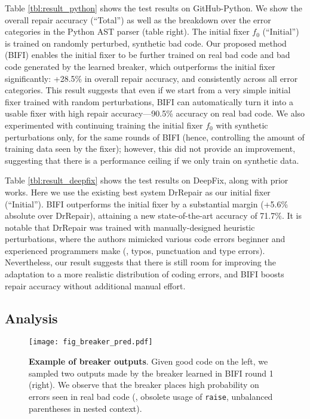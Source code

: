 Table \ref{tbl:result_python} shows the test results on GitHub-Python. We show the overall repair accuracy (``Total'') as well as the breakdown over the error categories in the Python AST parser (table right).
The initial fixer $f_0$ (``Initial'') 
is trained on randomly perturbed, synthetic bad code. 
Our proposed method (BIFI) enables the initial fixer to be further trained on real bad code and bad code generated by the learned breaker, which outperforms the initial fixer significantly: +28.5\% in overall repair accuracy, and consistently across all error categories.
This result suggests that even if we start from a very simple initial fixer trained with random perturbations, BIFI can automatically turn it into a usable fixer with high repair accuracy---90.5\% accuracy on real bad code.
We also experimented with continuing training the initial fixer $f_0$ with synthetic perturbations only, for the same rounds of BIFI (hence, controlling the amount of training data seen by the fixer); however, this did not provide an improvement, suggesting that there is a performance ceiling if we only train on synthetic data.




Table \ref{tbl:result_deepfix} shows the test results on DeepFix, along with prior works.
Here we use the existing best system DrRepair as our initial fixer (``Initial''). BIFI outperforms the initial fixer by a substantial margin (+5.6\% absolute over DrRepair), attaining a new state-of-the-art accuracy of 71.7\%.
It is notable that DrRepair was trained with manually-designed heuristic perturbations, where the authors \cite{yasunaga2020repair} mimicked various code errors beginner and experienced programmers make (\eg, typos, punctuation and type errors). Nevertheless, our result suggests that there is still room for improving the adaptation to a more realistic distribution of coding errors, and BIFI boosts repair accuracy without additional manual effort.



\subsection{Analysis}
\label{sec:analysis}

\begin{figure}[!t]
\hspace{-2mm}
    \texttt{[image: fig\_breaker\_pred.pdf]}\vspace{-7mm}
    \caption{
    \textbf{Example of breaker outputs}. Given good code on the left, we sampled two outputs made by the breaker learned in BIFI round 1 (right). We observe that the breaker places high probability on errors seen in real bad code (\ie, obsolete usage of \texttt{raise}, unbalanced parentheses in nested context).
    } \vspace{-3mm}
  \label{fig:breaker_pred}
\end{figure}

